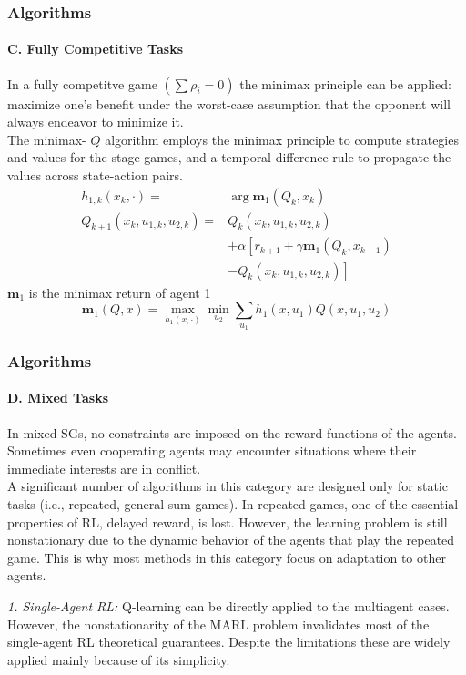 \documentclass{beamer}
\begin{document}
\begin{frame}
\frametitle{Algorithms}
\framesubtitle{C. Fully Competitive Tasks}
In a fully competitve game $(\sum \rho_i = 0)$ the minimax principle can be applied: maximize one’s benefit
under the worst-case assumption that the opponent will always
endeavor to minimize it.\\
The minimax- $Q$ algorithm employs the minimax principle to compute strategies and values for the stage games, and a temporal-difference rule to propagate the values across state-action pairs.
$$\begin{aligned}
h_{1, k}\left(x_k, \cdot\right)= & \arg \mathbf{m}_1\left(Q_k, x_k\right) \\
Q_{k+1}\left(x_k, u_{1, k}, u_{2, k}\right)= & Q_k\left(x_k, u_{1, k}, u_{2, k}\right) \\
& +\alpha\left[r_{k+1}+\gamma \mathbf{m}_1\left(Q_k, x_{k+1}\right)\right. \\
& \left.-Q_k\left(x_k, u_{1, k}, u_{2, k}\right)\right]
\end{aligned}$$
$\mathbf{m}_1$ is the minimax return of agent 1
$$
\mathbf{m}_1(Q, x)=\max _{h_1(x, \cdot)} \min _{u_2} \sum_{u_1} h_1\left(x, u_1\right) Q\left(x, u_1, u_2\right)
$$
\end{frame}

\begin{frame}
\frametitle{Algorithms}
\framesubtitle{D. Mixed Tasks}
In mixed SGs, no constraints are imposed on the reward functions of the agents. Sometimes even cooperating agents may encounter situations where their immediate interests are in conflict.\\

A significant number of algorithms in this category are designed only for static tasks (i.e., repeated, general-sum games).
In repeated games, one of the essential properties of RL, delayed
reward, is lost. However, the learning problem is still nonstationary due to the dynamic behavior of the agents that play the
repeated game. This is why most methods in this category focus
on adaptation to other agents.\vspace{4pt}

\textit{1. Single-Agent RL:} Q-learning can be directly applied to the multiagent cases.
However, the nonstationarity of the MARL problem invalidates
most of the single-agent RL theoretical guarantees. Despite the
limitations these are widely applied mainly because of its simplicity.

\end{frame}
\end{document}

